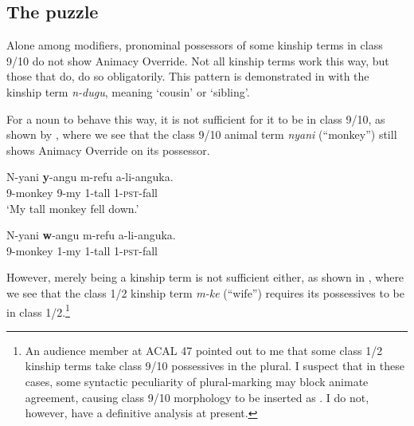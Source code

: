 \documentclass[output=paper
,newtxmath
,modfonts
,nonflat]{langsci/langscibook}
\begin{document}
 \subsection{The puzzle} \label{sec:pesetsky:puzzlesection}
 
Alone among modifiers, pronominal possessors of some kinship terms in class 9/10 do not show Animacy Override. Not all kinship terms work this way, but those that do, do so obligatorily.  This pattern is demonstrated in  with the kinship term \textit{n-dugu}, meaning `cousin' or `sibling'.
   
\ea\label{ex:pesetsky:contrast} 
      
   \z \z 

For a noun to behave this way, it is not sufficient for it to be in class 9/10, as shown by , where we see that the class 9/10 animal term \textit{nyani} (``monkey'') still shows Animacy Override on its possessor.

\ea\label{ex:pesetsky:trastcon} 
\ea\label{ex:pesetsky:nyania}{ 
    \gll *N-yani \textbf{y}-angu m-refu a-li-anguka.  \\
       \textsc{9}-monkey \textsc{9}-my \textsc{1}-tall \textsc{1}-\textsc{pst}-fall  \\ 
        \glt `My tall monkey fell down.' } 
        
 \ex\label{ex:pesetsky:nyanib}{ \gll N-yani \textbf{w}-angu m-refu a-li-anguka. \\
\textsc{9}-monkey \textsc{1}-my \textsc{1}-tall \textsc{1}-\textsc{pst}-fall  \\ } \z \z


However, merely being a kinship term is not sufficient either, as shown in , where we see that the class 1/2 kinship term \textit{m-ke} (``wife'') requires its possessives to be in class 1/2.\footnote{An audience member at ACAL 47 pointed out to me that some class 1/2 kinship terms take class 9/10 possessives in the plural.  I suspect that in these cases, some syntactic peculiarity of plural-marking may block animate agreement, causing class 9/10 morphology to be inserted as .  I do not, however, have a definitive analysis at present.}
\end{document}
